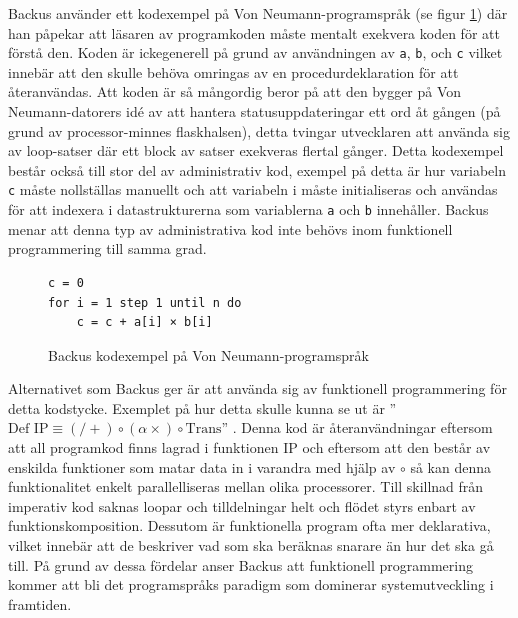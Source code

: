 \documentclass{TDP003mall}
\begin{document}
Backus\cite{backus_can_1978} använder ett kodexempel på Von Neumann-programspråk (se figur \ref{fig:vonneumann}) där han påpekar att läsaren av programkoden måste mentalt exekvera koden för att förstå den. Koden är ickegenerell på grund av användningen av \texttt{a}, \texttt{b}, och \texttt{c} vilket innebär att den skulle behöva omringas av en procedurdeklaration för att återanvändas. Att koden är så mångordig beror på att den bygger på Von Neumann-datorers idé av att hantera statusuppdateringar ett ord åt gången (på grund av processor-minnes flaskhalsen), detta tvingar utvecklaren att använda sig av loop-satser där ett block av satser exekveras flertal gånger. Detta kodexempel består också till stor del av administrativ kod, exempel på detta är hur variabeln \texttt{c} måste nollställas manuellt och att variabeln i måste initialiseras och användas för att indexera i datastrukturerna som variablerna \texttt{a} och \texttt{b} innehåller. Backus \cite{backus_can_1978} menar att denna typ av administrativa kod inte behövs inom funktionell programmering till samma grad.

\begin{figure}[H]
    \centering
    \begin{minipage}{0.4\linewidth}
    \begin{verbatim}
c = 0
for i = 1 step 1 until n do
    c = c + a[i] × b[i]
    \end{verbatim}
    \end{minipage}
    \caption{Backus kodexempel på Von Neumann-programspråk \cite{backus_can_1978}}
    \label{fig:vonneumann}
\end{figure}

Alternativet som Backus \cite{backus_can_1978} ger är att använda sig av funktionell programmering för detta kodstycke. Exemplet på hur detta skulle kunna se ut är ''$\text{Def IP} \equiv (/+) \circ (\alpha\times) \circ \text{Trans}$'' \cite{backus_can_1978}. Denna kod är återanvändningar eftersom att all programkod finns lagrad i funktionen $\text{IP}$ och eftersom att den består av enskilda funktioner som matar data in i varandra med hjälp av $\circ$ så kan denna funktionalitet enkelt parallelliseras mellan olika processorer. Till skillnad från imperativ kod saknas loopar och tilldelningar helt och flödet styrs enbart av funktionskomposition. Dessutom är funktionella program ofta mer deklarativa, vilket innebär att de beskriver vad som ska beräknas snarare än hur det ska gå till. På grund av dessa fördelar anser Backus\cite{backus_can_1978} att funktionell programmering kommer att bli det programspråks paradigm som dominerar systemutveckling i framtiden.
\end{document}
